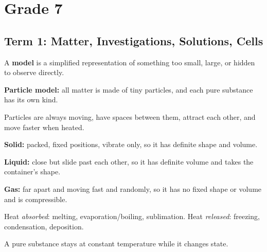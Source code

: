 \section{Grade 7}
\resetcards
\begin{gradebody}

\subsection{Term 1: Matter, Investigations, Solutions, Cells}

\kf
\begin{keyfacts}
\item A \textbf{model} is a simplified representation of something too small, large, or hidden to observe directly.
\item \textbf{Particle model:} all matter is made of tiny particles, and each pure substance has its own kind.
\item Particles are always moving, have spaces between them, attract each other, and move faster when heated.
\item \textbf{Solid:} packed, fixed positions, vibrate only, so it has definite shape and volume.
\item \textbf{Liquid:} close but slide past each other, so it has definite volume and takes the container's shape.
\item \textbf{Gas:} far apart and moving fast and randomly, so it has no fixed shape or volume and is compressible.
\item Heat \emph{absorbed}: melting, evaporation/boiling, sublimation. Heat \emph{released}: freezing, condensation, deposition.
\item A pure substance stays at constant temperature while it changes state.
\end{keyfacts}
\cards
{}

\end{gradebody}
